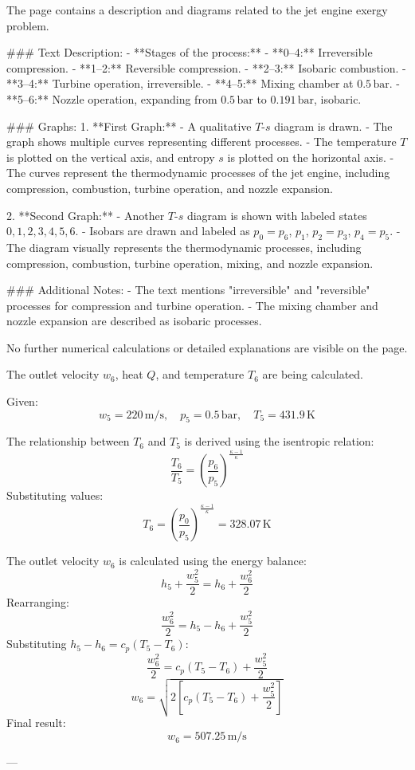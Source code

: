 The page contains a description and diagrams related to the jet engine exergy problem.  

### Text Description:  
- **Stages of the process:**  
  - **0–4:** Irreversible compression.  
  - **1–2:** Reversible compression.  
  - **2–3:** Isobaric combustion.  
  - **3–4:** Turbine operation, irreversible.  
  - **4–5:** Mixing chamber at \( 0.5 \, \text{bar} \).  
  - **5–6:** Nozzle operation, expanding from \( 0.5 \, \text{bar} \) to \( 0.191 \, \text{bar} \), isobaric.  

### Graphs:  
1. **First Graph:**  
   - A qualitative \( T \)-\( s \) diagram is drawn.  
   - The graph shows multiple curves representing different processes.  
   - The temperature \( T \) is plotted on the vertical axis, and entropy \( s \) is plotted on the horizontal axis.  
   - The curves represent the thermodynamic processes of the jet engine, including compression, combustion, turbine operation, and nozzle expansion.  

2. **Second Graph:**  
   - Another \( T \)-\( s \) diagram is shown with labeled states \( 0, 1, 2, 3, 4, 5, 6 \).  
   - Isobars are drawn and labeled as \( p_0 = p_6 \), \( p_1 \), \( p_2 = p_3 \), \( p_4 = p_5 \).  
   - The diagram visually represents the thermodynamic processes, including compression, combustion, turbine operation, mixing, and nozzle expansion.  

### Additional Notes:  
- The text mentions "irreversible" and "reversible" processes for compression and turbine operation.  
- The mixing chamber and nozzle expansion are described as isobaric processes.  

No further numerical calculations or detailed explanations are visible on the page.

The outlet velocity \( w_6 \), heat \( Q \), and temperature \( T_6 \) are being calculated.  

Given:  
\[
w_5 = 220 \, \text{m/s}, \quad p_5 = 0.5 \, \text{bar}, \quad T_5 = 431.9 \, \text{K}
\]  

The relationship between \( T_6 \) and \( T_5 \) is derived using the isentropic relation:  
\[
\frac{T_6}{T_5} = \left( \frac{p_6}{p_5} \right)^{\frac{\kappa-1}{\kappa}}
\]  
Substituting values:  
\[
T_6 = \left( \frac{p_0}{p_5} \right)^{\frac{\kappa-1}{\kappa}} = 328.07 \, \text{K}
\]  

The outlet velocity \( w_6 \) is calculated using the energy balance:  
\[
h_5 + \frac{w_5^2}{2} = h_6 + \frac{w_6^2}{2}
\]  
Rearranging:  
\[
\frac{w_6^2}{2} = h_5 - h_6 + \frac{w_5^2}{2}
\]  
Substituting \( h_5 - h_6 = c_p(T_5 - T_6) \):  
\[
\frac{w_6^2}{2} = c_p(T_5 - T_6) + \frac{w_5^2}{2}
\]  
\[
w_6 = \sqrt{2 \left[ c_p(T_5 - T_6) + \frac{w_5^2}{2} \right]}
\]  
Final result:  
\[
w_6 = 507.25 \, \text{m/s}
\]  

---